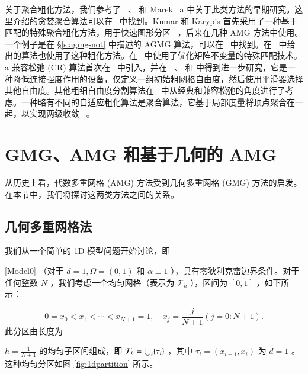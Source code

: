 \documentclass[12pt]{acta_2011xz}
\newcommand{\Label}{\label}
\newcommand{\cth}{{\cal T}_h}
\begin{document}
关于聚合粗化方法，我们参考了~    \cite{Vakhutinsky.I;Dudkin.L;Ryvkin.A.1979a}    、
   \cite{Blaheta.R.1986a}    和 Marek~    \cite{Marek.I.1991a}    a 中关于此类方法的早期研究。这里介绍的贪婪聚合算法可以在~    \cite{1996VanekP_MandelJ_BrezinaM-aa}    中找到。Kumar 和 Karypis 首先采用了一种基于匹配的特殊聚合粗化方法，用于快速图形分区~    \cite{Karypis.G;Kumar.V.1998a}    ，后来在几种 AMG 方法中使用。一个例子是在
   \S       \ref{s:agmg-not}    中描述的 AGMG 算法，可以在~    \cite{Napov.A;Notay.Y.2012a,Notay.Y.2012b}    中找到。在~    \cite{Kim.H;Xu.J;Zikatanov.L.2003b}    中给出的算法也使用了这种粗化方法。在~    \cite{DAmbra.P;Vassilevski.P.2014a,DAmbra.P;Vassilevski.P.2013a}    中使用了优化矩阵不变量的特殊匹配技术。 a 兼容松弛 (CR) 算法首次在~    \cite{2000BrandtA-aa}    中引入，并在~    \cite{Livne.O.2004a}    、    \cite{Falgout.R;Vassilevski.P.2004a}    和
   \cite{CR}    中得到进一步研究，它是一种降低连接强度作用的设备，仅定义一组初始粗网格自由度，然后使用平滑器选择其他自由度。其他粗细自由度分割算法在~    \cite{MacLachlan.S;Saad.Y.2007a}    中从经典和兼容松弛的角度进行了考虑。一种略有不同的自适应粗化算法是聚合算法，它基于局部度量将顶点聚合在一起，以实现两级收敛~    \cite{Notay.Y.2010b,Napov.A;Notay.Y.2012a,Livne.O;Brandt.A.2012a}    。  

   \section{GMG、AMG 和基于几何的 AMG  }       \label{s:GMG}    从历史上看，代数多重网格 (AMG) 方法受到几何多重网格 (GMG) 方法的启发。在本节中，我们将探讨这两类方法之间的关系。

   \subsection{几何多重网格法  }    我们从一个简单的 1D 模型问题开始讨论，即

   \eqref{Model0}   （对于    $d=1, \Omega=(0,1)$    和    $\alpha\equiv 1$   ），具有零狄利克雷边界条件。对于任何整数    $N$    ，我们考虑一个均匀网格（表示为    ${\mathcal T}_h$    ），区间为    $[0,1]$    ，如下所示：

   \begin{equation}\Label{1dpartition}
        0=x_0<x_1<\cdots<x_{N+1}=1, \quad x_j=\frac{j}{N+1} (j=0:N+1).
\end{equation}    此分区由长度为

   $h=\frac{1}{N+1}$    的均匀子区间组成，即    $\cth=\bigcup_{i} \{ \tau_i \}  $   ，其中    $\tau_i=(x_{i-1}, x_i)$    为    $d=1$    。这种均匀分区如图    \ref{fig:1dpartition}    所示。  
\end{document}
